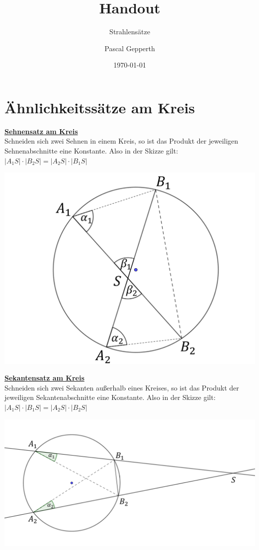 \documentclass[a4paper,headlines=4, footlines=1]{scrartcl}
\title{Handout}
\subtitle{Strahlensätze}
\author{Pascal Gepperth}
\date{\today}
\begin{document}
\section*{Ähnlichkeitssätze am Kreis}
\begin{minipage}[b]{0.5\textwidth}
	\underline{\textbf{Sehnensatz am Kreis}}\\
	Schneiden sich zwei Sehnen in einem Kreis, so ist das Produkt der jeweiligen Sehnenabschnitte eine Konstante. 
	Also in der Skizze gilt:$ |A_1S|\cdot|B_2S|=|A_2S|\cdot|B_1S| $ 	
\end{minipage}
\begin{minipage}{0.5\textwidth}
	\begin{flushright}
		\includegraphics[scale=0.15]{Sehnensatz}
	\end{flushright}		
\end{minipage}	
\begin{minipage}[b]{0.5\textwidth}
	\underline{\textbf{Sekantensatz am Kreis}}\\ Schneiden sich zwei Sekanten außerhalb eines Kreises, so ist das Produkt der jeweiligen Sekantenabschnitte eine Konstante. 
	Also in der Skizze gilt: \\ $ |A_1S|\cdot|B_1S|=|A_2S|\cdot|B_2S| $	
\end{minipage}
\begin{minipage}{0.5\textwidth}
	\begin{flushright}
		\includegraphics[scale=0.18]{Sekantensatz}
	\end{flushright}		
\end{minipage}	
\end{document}
